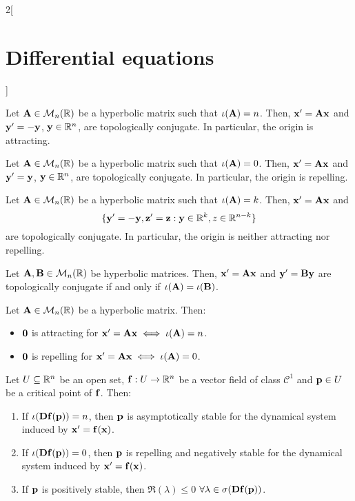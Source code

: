 \documentclass[../../../main_math.tex]{subfiles}
\begin{document}
\begin{multicols}{2}[\section{Differential equations}]
\begin{theorem}
    Let $\vf{A}\in\mathcal{M}_n(\RR)$ be a hyperbolic matrix such that $\iota(\vf{A})=n$. Then, $\vf{x}'=\vf{A}\vf{x}$ and $\vf{y}'=-\vf{y}$, $\vf{y}\in\RR^n$, are topologically conjugate. In particular, the origin is attracting.
  \end{theorem}
  \begin{corollary}
    Let $\vf{A}\in\mathcal{M}_n(\RR)$ be a hyperbolic matrix such that $\iota(\vf{A})=0$. Then, $\vf{x}'=\vf{A}\vf{x}$ and $\vf{y}'=\vf{y}$, $\vf{y}\in\RR^n$, are topologically conjugate. In particular, the origin is repelling.
  \end{corollary}
  \begin{corollary}
    Let $\vf{A}\in\mathcal{M}_n(\RR)$ be a hyperbolic matrix such that $\iota(\vf{A})=k$. Then, $\vf{x}'=\vf{A}\vf{x}$ and $$\{\vf{y}'=-\vf{y}, \vf{z}'=\vf{z}:\vf{y}\in\RR^k,{z}\in\RR^{n-k}\}$$ are topologically conjugate. In particular, the origin is neither attracting nor repelling.
  \end{corollary}
  \begin{theorem}
    Let $\vf{A},\vf{B}\in\mathcal{M}_n(\RR)$ be hyperbolic matrices. Then, $\vf{x}'=\vf{A}\vf{x}$ and $\vf{y}'=\vf{B}\vf{y}$ are topologically conjugate if and only if $\iota(\vf{A})=\iota(\vf{B})$.
  \end{theorem}
  \begin{corollary}
    Let $\vf{A}\in\mathcal{M}_n(\RR)$ be a hyperbolic matrix. Then:
    \begin{itemize}
      \item $\vf{0}$ is attracting for $\vf{x}'=\vf{A}\vf{x}\iff\iota(\vf{A})=n$.
      \item $\vf{0}$ is repelling for $\vf{x}'=\vf{A}\vf{x}\iff\iota(\vf{A})=0$.
    \end{itemize}
  \end{corollary}
  \begin{theorem}
    Let $U\subseteq \RR^n$ be an open set, $\vf{f}:U\rightarrow\RR^n$ be a vector field of class $\mathcal{C}^1$ and $\vf{p}\in U$ be a critical point of $\vf{f}$. Then:
    \begin{enumerate}
      \item If $\iota(\vf{Df}(\vf{p}))=n$, then $\vf{p}$ is asymptotically stable for the dynamical system induced by $\vf{x}'=\vf{f}(\vf{x})$.
      \item If $\iota(\vf{Df}(\vf{p}))=0$, then $\vf{p}$ is repelling and negatively stable for the dynamical system induced by $\vf{x}'=\vf{f}(\vf{x})$.
      \item If $\vf{p}$ is positively stable, then $\Re(\lambda)\leq 0$ $\forall\lambda\in\sigma(\vf{Df}(\vf{p}))$.

\end{enumerate}
\end{theorem}
\end{multicols}
\end{document}
